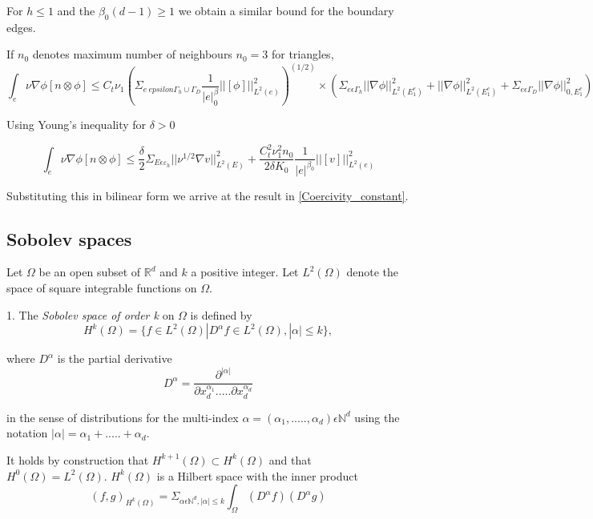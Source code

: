 \documentclass[a4paper,12pt]{book}
\begin{document}
For $h \leq 1$ and the $\beta_0 (d-1) \geq 1$ we obtain a similar bound for the boundary edges.

If $n_0$ denotes maximum number of neighbours $n_0 = 3$ for triangles,
\begin{equation}
\int_e {\nu \nabla \phi}[n \otimes \phi] \leq C_t \nu_1 (\Sigma_{e \ epsilon \Gamma_h \cup \Gamma_D} \frac{1}{|e|^\beta_0} ||[\phi]||^2_{L^2(e)})^(1/2) \times (\Sigma_{e \epsilon \Gamma_h} ||\nabla \phi||^2_{L^2(E_1^e)} + ||\nabla \phi||^2_{L^2(E_1^e)} + \Sigma_{e \epsilon \Gamma_D} ||\nabla \phi||^2_{0,E_1^e})
\end{equation}

Using Young's inequality for $\delta > 0$

\begin{equation}
\int_e {\nu \nabla \phi}[n \otimes \phi] \leq \frac{\delta}{2} \Sigma_{E \epsilon \varepsilon_h} ||\nu^{1/2} \nabla v ||^2_{L^2(E)} +  \frac{C_t^2 \nu_1^2 n_0}{2 \delta K_0} \frac{1}{|e|^{\beta_0}} ||[v]||^2_{L^2(e)}
\end{equation}


Substituting this in bilinear form we arrive at the result in \ref{Coercivity_constant}.

\subsection{Sobolev spaces} \cite{crbm}

Let $\Omega$ be an open subset of $\mathbb{R}^d$ and $k$ a positive integer. Let $L^2(\Omega)$ denote the space of square integrable functions on $\Omega$. 

1. The \textit{Sobolev space of order k} on $\Omega$ is defined by\\
\begin{equation}
H^k (\Omega) = \lbrace f \in L^2 (\Omega) | D^\alpha f \in L^2 (\Omega), |\alpha| \leq k \rbrace ,
\end{equation} 

where $D^\alpha$ is the partial derivative
\begin{equation}
D^\alpha = \frac{\partial^{|\alpha|}}{\partial x_d^{\alpha_1} ..... \partial x_d^{\alpha_d}}
\end{equation}

in the sense of distributions for the multi-index $\alpha = (\alpha_1,.....,\alpha_d) \epsilon \mathbb{N}^d$ using the notation $|\alpha| = \alpha_1 + ..... + \alpha_d $.

It holds by construction that $H^{k+1}(\Omega) \subset H^k (\Omega)$ and that $H^0 (\Omega) = L^2 (\Omega)$. $H^k(\Omega)$ is a Hilbert space with the inner product
\begin{equation}
(f,g)_{H^k(\Omega)} = \Sigma_{\alpha \epsilon \mathbb{N}^d, |\alpha| \leq k} \int_\Omega (D^\alpha f) (D^\alpha g)
\end{equation}
\end{document}
